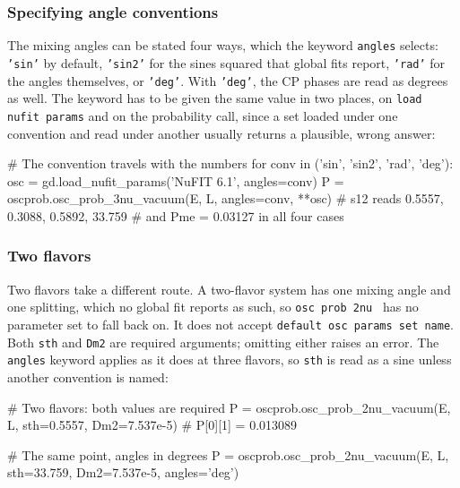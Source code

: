 \documentclass[final,5p,times,twocolumn,sort,compress]{elsarticle}
\makeatletter
\DeclareRobustCommand{\_}{%
  \ifmmode\nfss@text{\textunderscore}\else\textunderscore\allowbreak\fi}
\makeatother
\begin{document}

\subsubsection{Specifying angle conventions}
\label{sec:angle_conventions}

The mixing angles can be stated four ways, which the keyword {\tt angles} selects: {\tt 'sin'} by default, {\tt 'sin2'} for the sines squared that global fits report, {\tt 'rad'} for the angles themselves, or {\tt 'deg'}. With {\tt 'deg'}, the CP phases are read as degrees as well. The keyword has to be given the same value in two places, on {\tt load\_nufit\_params} and on the probability call, since a set loaded under one convention and read under another usually returns a plausible, wrong answer:
\begin{pysnip}
# The convention travels with the numbers
for conv in ('sin', 'sin2', 'rad', 'deg'):
    osc = gd.load_nufit_params('NuFIT 6.1',
     angles=conv)
    P = oscprob.osc_prob_3nu_vacuum(E, L,
     angles=conv, **osc)
# s12 reads 0.5557, 0.3088, 0.5892, 33.759
# and Pme = 0.03127 in all four cases
\end{pysnip}


\subsubsection{Two flavors}
\label{sec:two_flavors}

Two flavors take a different route. A two-flavor system has one mixing angle and one splitting, which no global fit reports as such, so {\tt osc\_prob\_2nu\_*} has no parameter set to fall back on. It does not accept {\tt default\_osc\_params\_set\_name}. Both {\tt sth} and {\tt Dm2} are required arguments; omitting either raises an error. The {\tt angles} keyword applies as it does at three flavors, so {\tt sth} is read as a sine unless another convention is named:
\begin{pysnip}
# Two flavors: both values are required
P = oscprob.osc_prob_2nu_vacuum(E, L,
 sth=0.5557, Dm2=7.537e-5)
# P[0][1] = 0.013089

# The same point, angles in degrees
P = oscprob.osc_prob_2nu_vacuum(E, L,
 sth=33.759, Dm2=7.537e-5, angles='deg')
\end{pysnip}

\end{document}
